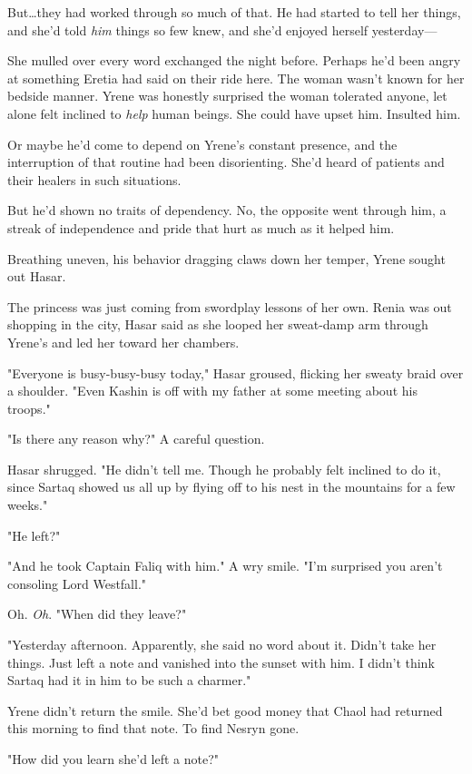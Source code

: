 But\ldots they had worked through so much of that.
He had started to tell her things, and she'd told \emph{him} things so few knew, and she'd enjoyed herself yesterday---

She mulled over every word exchanged the night before.
Perhaps he'd been angry at something Eretia had said on their ride here.
The woman wasn't known for her bedside manner.
Yrene was honestly surprised the woman tolerated anyone, let alone felt inclined to \emph{help} human beings.
She could have upset him.
Insulted him.

Or maybe he'd come to depend on Yrene's constant presence, and the interruption of that routine had been disorienting.
She'd heard of patients and their healers in such situations.

But he'd shown no traits of dependency.
No, the opposite went through him, a streak of independence and pride that hurt as much as it helped him.

Breathing uneven, his behavior dragging claws down her temper, Yrene sought out Hasar.

The princess was just coming from swordplay lessons of her own.
Renia was out shopping in the city, Hasar said as she looped her sweat-damp arm through Yrene's and led her toward her chambers.

"Everyone is busy-busy-busy today," Hasar groused, flicking her sweaty braid over a shoulder.
"Even Kashin is off with my father at some meeting about his troops."

"Is there any reason why?"
A careful question.

Hasar shrugged.
"He didn't tell me.
Though he probably felt inclined to do it, since Sartaq showed us all up by flying off to his nest in the mountains for a few weeks."

"He left?"

"And he took Captain Faliq with him."
A wry smile.
"I'm surprised you aren't consoling Lord Westfall."

Oh.
\emph{Oh}.
"When did they leave?"

"Yesterday afternoon.
Apparently, she said no word about it.
Didn't take her things.
Just left a note and vanished into the sunset with him.
I didn't think Sartaq had it in him to be such a charmer."

Yrene didn't return the smile.
She'd bet good money that Chaol had returned this morning to find that note.
To find Nesryn gone.

"How did you learn she'd left a note?"

